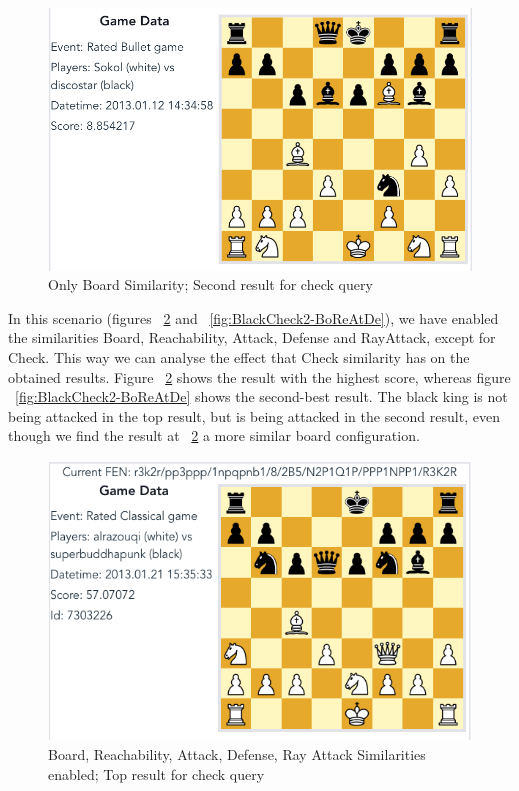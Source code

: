 \documentclass[11pt]{article}
\begin{document}
    \begin{figure}[H]
        \centering
        \includegraphics[width=12cm]{images/BlackCheck2-Bo}
        \caption{Only Board Similarity; Second result for check query}
        \label{fig:BlackCheck2-Bo}
    \end{figure}

    In this scenario (figures ~\ref{fig:BlackCheck1-BoReAtDe} and ~\ref{fig:BlackCheck2-BoReAtDe}), we have enabled the similarities Board, Reachability, Attack, Defense and RayAttack, except for Check. This way we can analyse the effect that Check similarity has on the obtained results. Figure ~\ref{fig:BlackCheck1-BoReAtDe} shows the result with the highest score, whereas figure ~\ref{fig:BlackCheck2-BoReAtDe} shows the second-best result. The black king is not being attacked in the top result, but is being attacked in the second result, even though we find the result at ~\ref{fig:BlackCheck1-BoReAtDe} a more similar board configuration.

    \begin{figure}[H]
        \centering
        \includegraphics[width=12cm]{images/BlackCheck1-BoReAtDe}
        \caption{Board, Reachability, Attack, Defense, Ray Attack Similarities enabled; Top result for check query}
        \label{fig:BlackCheck1-BoReAtDe}
    \end{figure}
\end{document}
